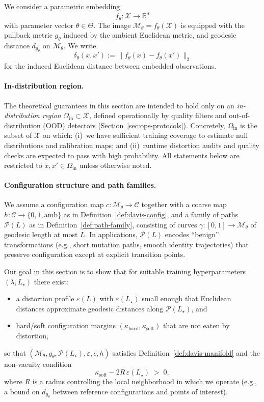 \documentclass[11pt]{article}
\newcommand{\RR}{\mathbb{R}}
\begin{document}
We consider a parametric embedding
\[
f_\theta : \mathcal{X} \to \RR^d
\]
with parameter vector $\theta \in \Theta$. The image $\mathcal{M}_\theta = f_\theta(\mathcal{X})$ is
equipped with the pullback metric $g_\theta$ induced by the ambient Euclidean metric, and geodesic
distance $d_{g_\theta}$ on $\mathcal{M}_\theta$. We write
\[
\delta_\theta(x,x') := \bigl\| f_\theta(x) - f_\theta(x') \bigr\|_2
\]
for the induced Euclidean distance between embedded observations.

\paragraph{In-distribution region.}
The theoretical guarantees in this section are intended to hold only on an
\emph{in-distribution region} $\Omega_{\mathrm{in}} \subset \mathcal{X}$, defined operationally by
quality filters and out-of-distribution (OOD) detectors (Section~\ref{sec:ops-protocols}).
Concretely, $\Omega_{\mathrm{in}}$ is the subset of $\mathcal{X}$ on which:
(i)~we have sufficient training coverage to estimate null distributions and calibration maps; and
(ii)~runtime distortion audits and quality checks are expected to pass with high probability.
All statements below are restricted to $x,x' \in \Omega_{\mathrm{in}}$ unless otherwise noted.

\paragraph{Configuration structure and path families.}
We assume a configuration map $c : \mathcal{M}_\theta \to \mathcal{C}$ together with a coarse map
$h : \mathcal{C} \to \{0,1,\mathrm{amb}\}$ as in Definition~\ref{def:davis-config}, and a family of
paths $\mathcal{P}(L)$ as in Definition~\ref{def:path-family}, consisting of curves
$\gamma : [0,1] \to \mathcal{M}_\theta$ of geodesic length at most $L$. In applications,
$\mathcal{P}(L)$ encodes ``benign'' transformations (e.g., short mutation paths, smooth identity
trajectories) that preserve configuration except at explicit transition points.

Our goal in this section is to show that for suitable training hyperparameters $(\lambda, L_\star)$
there exist:
\begin{itemize}
  \item a distortion profile $\varepsilon(L)$ with $\varepsilon(L_\star)$ small enough that
    Euclidean distances approximate geodesic distances along $\mathcal{P}(L_\star)$, and
  \item hard/soft configuration margins $(\kappa_{\mathrm{hard}},\kappa_{\mathrm{soft}})$ that are not
    eaten by distortion,
\end{itemize}
so that $(\mathcal{M}_\theta, g_\theta, \mathcal{P}(L_\star), \varepsilon, c, h)$ satisfies
Definition~\ref{def:davis-manifold} and the non-vacuity condition
\begin{equation}
\label{eq:non-vacuity}
\kappa_{\mathrm{soft}} - 2 R \,\varepsilon(L_\star) \;>\; 0,
\end{equation}
where $R$ is a radius controlling the local neighborhood in which we operate
(e.g., a bound on $d_{g_\theta}$ between reference configurations and points of interest).
\end{document}

